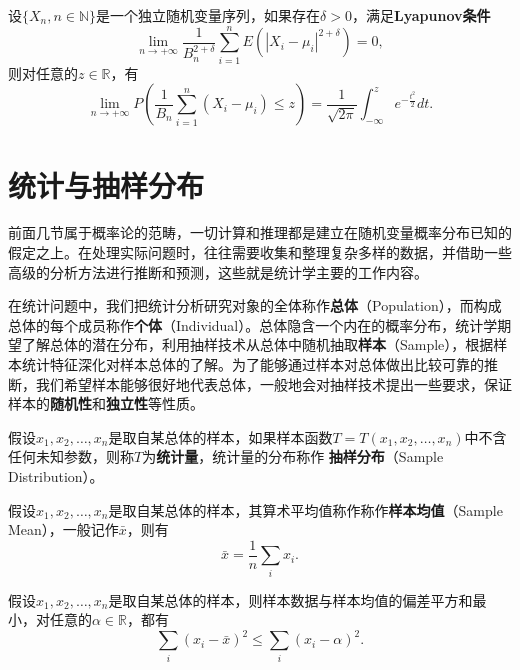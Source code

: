 \begin{theorem}[Lyapunov中心极限定理]
设$\{X_n,n\in \mathbb N\}$是一个独立随机变量序列，如果存在$\delta>0$，满足\textbf{Lyapunov条件}
\begin{equation}\label{eq:Lyapunov-condition}
    \lim\limits_{n\rightarrow +\infty} \frac{1}{B_n^{2+\delta}} \sum\limits_{i=1}^n  E(|X_i-\mu_i|^{2+\delta}) =0,
\end{equation}
则对任意的$z\in \mathbb R$，有
\[
   \lim\limits_{n\rightarrow +\infty} P(\frac{1}{B_n} \sum\limits_{i=1}^n (X_i-\mu_i) \le z) = \frac{1}{\sqrt{2\pi}}\int_{-\infty}^z e^{-\frac{t^2}{2}}dt.
\]
\end{theorem}

\section{统计与抽样分布}
前面几节属于概率论的范畴，一切计算和推理都是建立在随机变量概率分布已知的假定之上。在处理实际问题时，往往需要收集和整理复杂多样的数据，并借助一些高级的分析方法进行推断和预测，这些就是统计学主要的工作内容。

在统计问题中，我们把统计分析研究对象的全体称作\textbf{总体}（Population），而构成总体的每个成员称作\textbf{个体}（Individual）。总体隐含一个内在的概率分布，统计学期望了解总体的潜在分布，利用抽样技术从总体中随机抽取\textbf{样本}（Sample），根据样本统计特征深化对样本总体的了解。为了能够通过样本对总体做出比较可靠的推断，我们希望样本能够很好地代表总体，一般地会对抽样技术提出一些要求，保证样本的\textbf{随机性}和\textbf{独立性}等性质。

\begin{definition}[统计量]
假设$x_1,x_2,\ldots,x_n$是取自某总体的样本，如果样本函数$T=T(x_1,x_2,\ldots, x_n)$中不含任何未知参数，则称$T$为\textbf{统计量}，统计量的分布称作
\textbf{抽样分布}（Sample Distribution）。
\end{definition}

\begin{definition}[样本均值]
假设$x_1,x_2,\ldots,x_n$是取自某总体的样本，其算术平均值称作称作\textbf{样本均值}（Sample Mean），一般记作$\bar x$，则有
\begin{equation}
    \bar x = \frac{1}{n} \sum\limits_i  x_i.
\end{equation}
\end{definition}

\begin{theorem}
假设$x_1,x_2,\ldots,x_n$是取自某总体的样本，则样本数据与样本均值的偏差平方和最小，对任意的$\alpha\in \mathbb R$，都有
\[
    \sum\limits_i (x_i - \bar x)^2 \le \sum\limits_i (x_i - \alpha)^2.
\]
\end{theorem}

